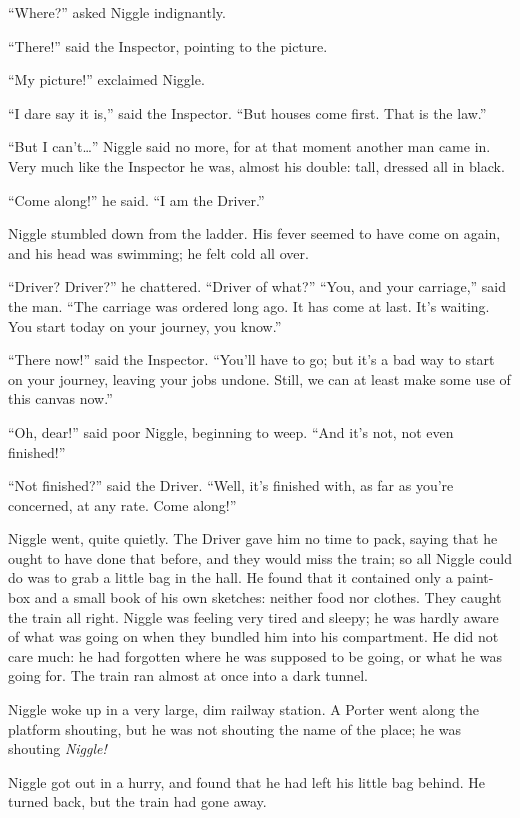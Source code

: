 \documentclass[english]{scrartcl}
\begin{document}
“Where?” asked Niggle indignantly.

“There!” said the Inspector, pointing to the picture.

“My picture!” exclaimed Niggle.

“I dare say it is,” said the Inspector. “But houses come first. That is the law.”

“But I can’t…” Niggle said no more, for at that moment another man came in. Very much like the Inspector he was, almost his double: tall, dressed all in black.

“Come along!” he said. “I am the Driver.”

Niggle stumbled down from the ladder. His fever seemed to have come on again, and his head was swimming; he felt cold all over.

“Driver? Driver?” he chattered. “Driver of what?” “You, and your carriage,” said the man. “The carriage was ordered long ago. It has come at last. It’s waiting. You start today on your journey, you know.”

“There now!” said the Inspector. “You’ll have to go; but it’s a bad way to start on your journey, leaving your jobs undone. Still, we can at least make some use of this canvas now.”

“Oh, dear!” said poor Niggle, beginning to weep. “And it’s not, not even finished!”

“Not finished?” said the Driver. “Well, it’s finished with, as far as you’re concerned, at any rate. Come along!”

Niggle went, quite quietly. The Driver gave him no time to pack, saying that he ought to have done that before, and they would miss the train; so all Niggle could do was to grab a little bag in the hall. He found that it contained only a paint-box and a small book of his own sketches: neither food nor clothes. They caught the train all right. Niggle was feeling very tired and sleepy; he was hardly aware of what was going on when they bundled him into his compartment. He did not care much: he had forgotten where he was supposed to be going, or what he was going for. The train ran almost at once into a dark tunnel.

Niggle woke up in a very large, dim railway station. A Porter went along the platform shouting, but he was not shouting the name of the place; he was shouting \emph{Niggle!}

Niggle got out in a hurry, and found that he had left his little bag behind. He turned back, but the train had gone away.
\end{document}
